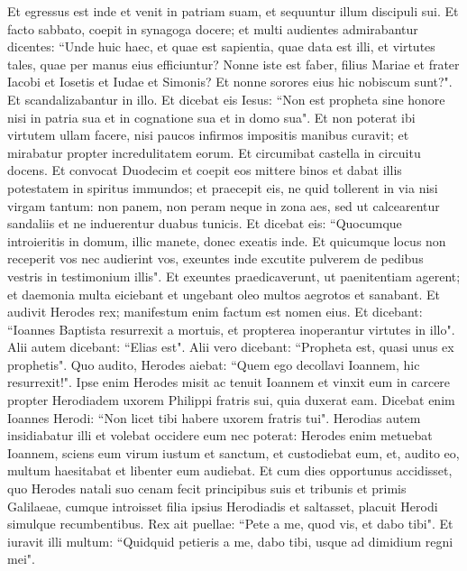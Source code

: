 \begin{biblechapter}  
\verse Et egressus est inde et venit in patriam suam, et sequuntur illum discipuli sui. 
\verse Et facto sabbato, coepit in synagoga docere; et multi audientes admirabantur dicentes: “Unde huic haec, et quae est sapientia, quae data est illi, et virtutes tales, quae per manus eius efficiuntur? 
\verse Nonne iste est faber, filius Mariae et frater Iacobi et Iosetis et Iudae et Simonis? Et nonne sorores eius hic nobiscum sunt?". Et scandalizabantur in illo. 
\verse Et dicebat eis Iesus: “Non est propheta sine honore nisi in patria sua et in cognatione sua et in domo sua". 
\verse Et non poterat ibi virtutem ullam facere, nisi paucos infirmos impositis manibus curavit; 
\verse et mirabatur propter incredulitatem eorum. Et circumibat castella in circuitu docens. 
\verse Et convocat Duodecim et coepit eos mittere binos et dabat illis potestatem in spiritus immundos; 
\verse et praecepit eis, ne quid tollerent in via nisi virgam tantum: non panem, non peram neque in zona aes, 
\verse sed ut calcearentur sandaliis et ne induerentur duabus tunicis. 
\verse Et dicebat eis: “Quocumque introieritis in domum, illic manete, donec exeatis inde. 
\verse Et quicumque locus non receperit vos nec audierint vos, exeuntes inde excutite pulverem de pedibus vestris in testimonium illis". 
\verse Et exeuntes praedicaverunt, ut paenitentiam agerent; 
\verse et daemonia multa eiciebant et ungebant oleo multos aegrotos et sanabant. 
\verse Et audivit Herodes rex; manifestum enim factum est nomen eius. Et dicebant: “Ioannes Baptista resurrexit a mortuis, et propterea inoperantur virtutes in illo". 
\verse Alii autem dicebant: “Elias est". Alii vero dicebant: “Propheta est, quasi unus ex prophetis". 
\verse Quo audito, Herodes aiebat: “Quem ego decollavi Ioannem, hic resurrexit!". 
\verse Ipse enim Herodes misit ac tenuit Ioannem et vinxit eum in carcere propter Herodiadem uxorem Philippi fratris sui, quia duxerat eam. 
\verse Dicebat enim Ioannes Herodi: “Non licet tibi habere uxorem fratris tui". 
\verse Herodias autem insidiabatur illi et volebat occidere eum nec poterat: 
\verse Herodes enim metuebat Ioannem, sciens eum virum iustum et sanctum, et custodiebat eum, et, audito eo, multum haesitabat et libenter eum audiebat. 
\verse Et cum dies opportunus accidisset, quo Herodes natali suo cenam fecit principibus suis et tribunis et primis Galilaeae, 
\verse cumque introisset filia ipsius Herodiadis et saltasset, placuit Herodi simulque recumbentibus. Rex ait puellae: “Pete a me, quod vis, et dabo tibi". 
\verse Et iuravit illi multum: “Quidquid petieris a me, dabo tibi, usque ad dimidium regni mei". 

\end{biblechapter}

